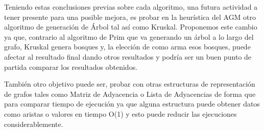 \documentclass[10pt,a4paper]{article}
\begin{document}
Teniendo estas conclusiones previas sobre cada algoritmo, una futura actividad a tener presente para una posible mejora, es probar en la heurística del AGM otro algoritmo de generación de Árbol tal así como Kruskal. Proponemos este cambio ya que, contrario al algoritmo de Prim que va generando un árbol a lo largo del grafo, Kruskal genera bosques y, la elección de como arma esos bosques, puede afectar al resultado final dando otros resultados y podría ser un buen punto de partida comparar los resultados obtenidos.

También otro objetivo puede ser, probar con otras estructuras de representación de grafos tales como Matriz de Adyacencia o Lista de Adyacencias de forma que para comparar tiempo de ejecución ya que alguna estructura puede obtener datos como aristas o valores en tiempo O(1) y esto puede reducir las ejecuciones considerablemente.
\end{document}
